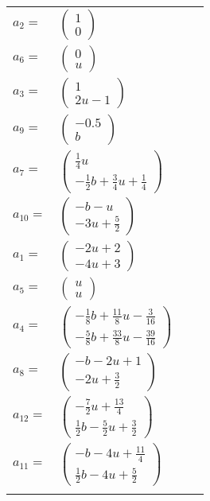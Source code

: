 \documentclass[1p]{elsarticle_modified}
\theoremstyle{definition}
\begin{document}
\begin{tabular}{m{7pt} m{180pt} m{7pt} m{180pt} }
\flushright $a_{2}=$&$\begin{pmatrix}1\\0\end{pmatrix}$ \\
\flushright $a_{6}=$&$\begin{pmatrix}0\\u\end{pmatrix}$ \\
\flushright $a_{3}=$&$\begin{pmatrix}1\\2 u-1\end{pmatrix}$ \\
\flushright $a_{9}=$&$\begin{pmatrix}-0.5\\b\end{pmatrix}$ \\
\flushright $a_{7}=$&$\begin{pmatrix}\frac{1}{4} u\\-\frac{1}{2} b+\frac{3}{4} u+\frac{1}{4}\end{pmatrix}$ \\
\flushright $a_{10}=$&$\begin{pmatrix}- b- u\\-3 u+\frac{5}{2}\end{pmatrix}$ \\
\flushright $a_{1}=$&$\begin{pmatrix}-2 u+2\\-4 u+3\end{pmatrix}$ \\
\flushright $a_{5}=$&$\begin{pmatrix}u\\u\end{pmatrix}$ \\
\flushright $a_{4}=$&$\begin{pmatrix}-\frac{1}{8} b+\frac{11}{8} u-\frac{3}{16}\\-\frac{5}{8} b+\frac{33}{8} u-\frac{39}{16}\end{pmatrix}$ \\
\flushright $a_{8}=$&$\begin{pmatrix}- b-2 u+1\\-2 u+\frac{3}{2}\end{pmatrix}$ \\
\flushright $a_{12}=$&$\begin{pmatrix}-\frac{7}{2} u+\frac{13}{4}\\\frac{1}{2} b-\frac{5}{2} u+\frac{3}{2}\end{pmatrix}$ \\
\flushright $a_{11}=$&$\begin{pmatrix}- b-4 u+\frac{11}{4}\\\frac{1}{2} b-4 u+\frac{5}{2}\end{pmatrix}$\\&\end{tabular}
\end{document}
